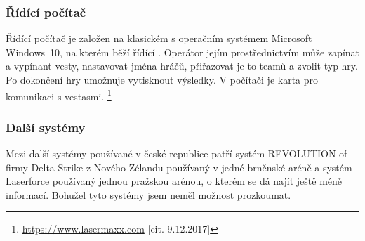 \subsubsection{Řídící počítač}
Řídící počítač je založen na klasickém  s operačním systémem Microsoft Windows~10, na kterém běží řídící . Operátor jejím prostřednictvím může zapínat a vypínant vesty, nastavovat jména hráčů, přiřazovat je to teamů a zvolit typ hry. Po dokončení hry umožnuje  vytisknout výsledky. V počítači je  karta pro komunikaci s vestasmi.
\footnote{\url{https://www.lasermaxx.com} [cit. 9.12.2017]}

\subsubsection{Další systémy}
Mezi další systémy používané v české republice patří systém REVOLUTION of firmy Delta Strike z Nového Zélandu používaný v jedné brněnské aréně a systém Laserforce používaný jednou pražskou arénou, o kterém se dá najít ještě méně informací. Bohužel tyto systémy jsem neměl možnost prozkoumat.
